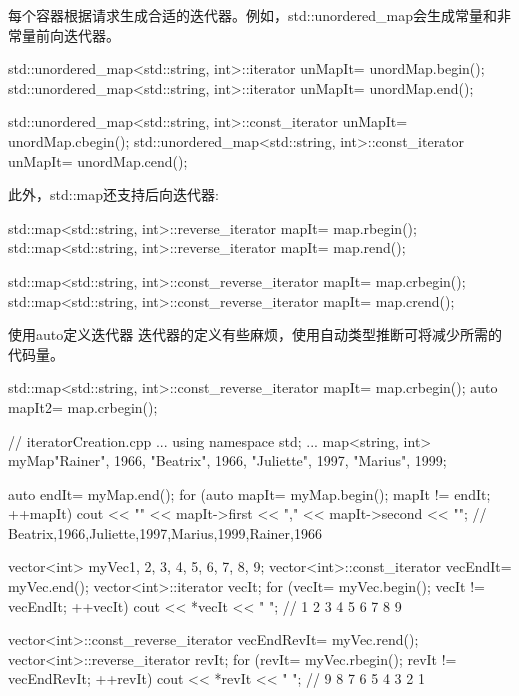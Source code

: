 每个容器根据请求生成合适的迭代器。例如，std::unordered\_map会生成常量和非常量前向迭代器。

\begin{cpp}
std::unordered_map<std::string, int>::iterator unMapIt= unordMap.begin();
std::unordered_map<std::string, int>::iterator unMapIt= unordMap.end();

std::unordered_map<std::string, int>::const_iterator unMapIt= unordMap.cbegin();
std::unordered_map<std::string, int>::const_iterator unMapIt= unordMap.cend();
\end{cpp}

此外，std::map还支持后向迭代器:

\begin{cpp}
std::map<std::string, int>::reverse_iterator mapIt= map.rbegin();
std::map<std::string, int>::reverse_iterator mapIt= map.rend();

std::map<std::string, int>::const_reverse_iterator mapIt= map.crbegin();
std::map<std::string, int>::const_reverse_iterator mapIt= map.crend();
\end{cpp}

\begin{myTip}{使用auto定义迭代器}
迭代器的定义有些麻烦，使用自动类型推断可将减少所需的代码量。

\begin{cpp}
std::map<std::string, int>::const_reverse_iterator
mapIt= map.crbegin();
auto mapIt2= map.crbegin();
\end{cpp}
\end{myTip}


\begin{cpp}
// iteratorCreation.cpp
...
using namespace std;
...
map<string, int> myMap{{"Rainer", 1966}, {"Beatrix", 1966}, {"Juliette", 1997},
						{"Marius", 1999}};
	
auto endIt= myMap.end();
for (auto mapIt= myMap.begin(); mapIt != endIt; ++mapIt)
	cout << "{" << mapIt->first << "," << mapIt->second << "}";
		// {Beatrix,1966},{Juliette,1997},{Marius,1999},{Rainer,1966}

vector<int> myVec{1, 2, 3, 4, 5, 6, 7, 8, 9};
vector<int>::const_iterator vecEndIt= myVec.end();
vector<int>::iterator vecIt;
for (vecIt= myVec.begin(); vecIt != vecEndIt; ++vecIt) cout << *vecIt << " ";
	// 1 2 3 4 5 6 7 8 9

vector<int>::const_reverse_iterator vecEndRevIt= myVec.rend();
vector<int>::reverse_iterator revIt;
for (revIt= myVec.rbegin(); revIt != vecEndRevIt; ++revIt) cout << *revIt << " ";
	// 9 8 7 6 5 4 3 2 1
\end{cpp}



